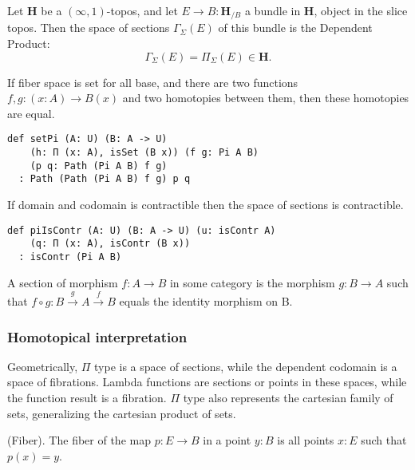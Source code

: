 \documentclass{article}
\begin{document}
\begin{definition}
Let $\mathbf{H}$ be a $(\infty,1)$-topos, and let $E \rightarrow B : \mathbf{H}_{/B}$ a bundle in
$\mathbf{H}$, object in the slice topos. Then the space of sections $\Gamma_\Sigma(E)$
of this bundle is the Dependent Product:
$$ \Gamma_\Sigma(E) = \Pi_\Sigma (E) \in \mathbf{H}. $$
\end{definition}

\begin{theorem}
If fiber space is set for all base, and there are two functions
$f,g : (x:A) \rightarrow B(x)$ and two homotopies between them, then these homotopies are equal.
\begin{lstlisting}
def setPi (A: U) (B: A -> U)
    (h: П (x: A), isSet (B x)) (f g: Pi A B)
    (p q: Path (Pi A B) f g)
  : Path (Path (Pi A B) f g) p q
\end{lstlisting}
\end{theorem}

\begin{theorem}[Contractability]
If domain and codomain is contractible then the space of sections is contractible.
\begin{lstlisting}
def piIsContr (A: U) (B: A -> U) (u: isContr A)
    (q: П (x: A), isContr (B x))
  : isContr (Pi A B)
\end{lstlisting}
\end{theorem}

\begin{definition}[Section]
A section of morphism $f: A \rightarrow B$ in some category is the morphism $g: B \rightarrow A$
such that $f \circ g: B \xrightarrow{g} A \xrightarrow{f} B$ equals the identity morphism on B.
\end{definition}

\subsubsection*{Homotopical interpretation}

Geometrically, $\Pi$ type is a space of sections, while the dependent codomain is a space of fibrations.
Lambda functions are sections or points in these spaces, while the function result is a fibration.
$\Pi$ type also represents the cartesian family of sets, generalizing the cartesian product of sets.

\begin{definition} (Fiber).
The fiber of the map $p: E \rightarrow B$ in a point $y: B$ is all points $x: E$ such that $p(x)=y$.
\end{definition}
\end{document}
